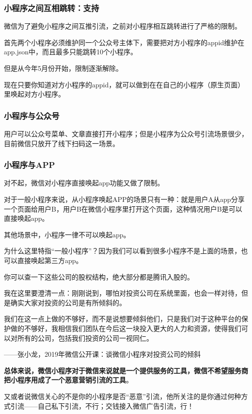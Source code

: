 \documentclass[12pt]{article}
\begin{document}
\subsubsection{小程序之间互相跳转：支持}
微信为了避免小程序之间互推引流，之前对小程序相互跳转进行了严格的限制。

首先两个小程序必须维护同一个公众号主体下，需要把对方小程序的appid维护在app.json中，而且最多只能跳转10个小程序。

但是从今年5月份开始，限制逐渐解除。

现在只要你知道对方小程序的appid，就可以做到在在自己的小程序（原生页面）里唤起对方小程序。

\subsubsection{小程序与公众号}
用户可以公众号菜单、文章直接打开小程序；但是小程序为公众号引流场景很少，目前微信只放开了线下扫码这一场景。

\subsubsection{小程序与APP}
对不起，微信对小程序直接唤起app功能又做了限制。

对于一般小程序来说，从小程序唤起APP的场景只有一种：就是用户A从app分享一个页面给用户B，用户B在微信小程序里打开这个页面，这种情况用户B是可以直接唤起app。

其他场景中，小程序一律不可以唤起app。

为什么这里特指“一般小程序”？因为我们可以看到很多小程序不是上面的场景，也可以直接唤起第三方app。

你可以查一下这些公司的股权结构，绝大部分都是腾讯入股的。

我在这里要澄清一点：刚刚说到，哪怕对投资公司在系统里面，也会一样对待，但是确实大家对投资的公司是有所倾斜的。

\begin{framed}
我们在这一点上做的不够好，而不是说想要倾斜他们，只是我们对于这种平台的保护做的不够好，我相信我们团队在今后这一块投入更大的人力和资源，使得我们可以对所有的公司，包括我们投资的公司一视同仁。

——张小龙，2019年微信公开课：谈微信小程序对投资公司的倾斜
\end{framed}

\textbf{总体来说，微信小程序对于微信来说就是一个提供服务的工具，微信不希望服务商把小程序用成了一个恶意营销引流的工具}。

又或者说微信关心的不是你的小程序是否“恶意”引流，他所关注的是你通过何种方式引流——自己私下引流，不行；交钱接入微信广告引流，行！
\end{document}
